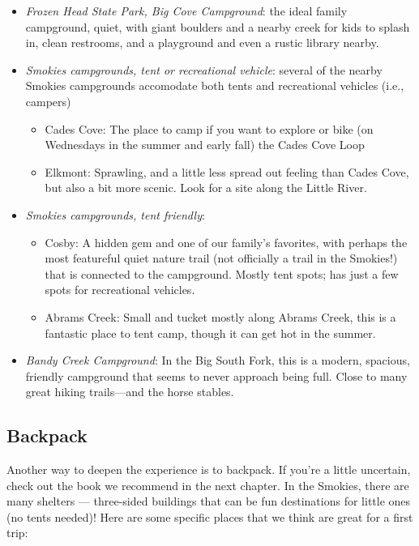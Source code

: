 \documentclass[
  letterpaper,
  DIV=11,
  numbers=noendperiod]{scrreprt}
\providecommand{\tightlist}{%
  \setlength{\itemsep}{0pt}\setlength{\parskip}{0pt}}\usepackage{longtable,booktabs,array}
\begin{document}
\begin{itemize}
\tightlist
\item
  \emph{Frozen Head State Park, Big Cove Campground}: the ideal family
  campground, quiet, with giant boulders and a nearby creek for kids to
  splash in, clean restrooms, and a playground and even a rustic library
  nearby.
\item
  \emph{Smokies campgrounds, tent or recreational vehicle}: several of
  the nearby Smokies campgrounds accomodate both tents and recreational
  vehicles (i.e., campers)

  \begin{itemize}
  \tightlist
  \item
    Cades Cove: The place to camp if you want to explore or bike (on
    Wednesdays in the summer and early fall) the Cades Cove Loop
  \item
    Elkmont: Sprawling, and a little less spread out feeling than Cades
    Cove, but also a bit more scenic. Look for a site along the Little
    River.
  \end{itemize}
\item
  \emph{Smokies campgrounds, tent friendly}:

  \begin{itemize}
  \tightlist
  \item
    Cosby: A hidden gem and one of our family's favorites, with perhaps
    the most featureful quiet nature trail (not officially a trail in
    the Smokies!) that is connected to the campground. Mostly tent
    spots; has just a few spots for recreational vehicles.
  \item
    Abrams Creek: Small and tucket mostly along Abrams Creek, this is a
    fantastic place to tent camp, though it can get hot in the summer.
  \end{itemize}
\item
  \emph{Bandy Creek Campground}: In the Big South Fork, this is a
  modern, spacious, friendly campground that seems to never approach
  being full. Close to many great hiking trails---and the horse stables.
\end{itemize}

\subsection{Backpack}\label{backpack}

Another way to deepen the experience is to backpack. If you're a little
uncertain, check out the book we recommend in the next chapter. In the
Smokies, there are many shelters --- three-sided buildings that can be
fun destinations for little ones (no tents needed)! Here are some
specific places that we think are great for a first trip:
\end{document}
